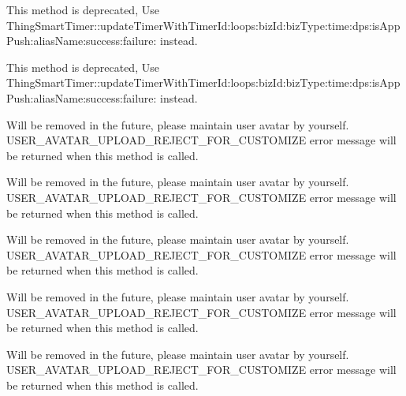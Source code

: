 \begin{DoxyRefList}
\label{deprecated__deprecated000128}%
%
This method is deprecated, Use Thing\+Smart\+Timer\+::update\+Timer\+With\+Timer\+Id\+:loops\+:biz\+Id\+:biz\+Type\+:time\+:dps\+:is\+App\+Push\+:alias\+Name\+:success\+:failure\+: instead. 

\label{deprecated__deprecated000110}%
%
This method is deprecated, Use Thing\+Smart\+Timer\+::update\+Timer\+With\+Timer\+Id\+:loops\+:biz\+Id\+:biz\+Type\+:time\+:dps\+:is\+App\+Push\+:alias\+Name\+:success\+:failure\+: instead.  
\item[Member \mbox{\hyperlink{interface_thing_smart_user_abab18c51135da5c939551c969058c966}{\mbox{[}Thing\+Smart\+User update\+Avatar\+With\+Image\+Url\+:success\+:failure\+:\mbox{]}}} ]\label{deprecated__deprecated000200}%
%
Will be removed in the future, please maintain user avatar by yourself. USER\+\_\+\+AVATAR\+\_\+\+UPLOAD\+\_\+\+REJECT\+\_\+\+FOR\+\_\+\+CUSTOMIZE error message will be returned when this method is called. 

\label{deprecated__deprecated000210}%
%
Will be removed in the future, please maintain user avatar by yourself. USER\+\_\+\+AVATAR\+\_\+\+UPLOAD\+\_\+\+REJECT\+\_\+\+FOR\+\_\+\+CUSTOMIZE error message will be returned when this method is called. 

\label{deprecated__deprecated000220}%
%
Will be removed in the future, please maintain user avatar by yourself. USER\+\_\+\+AVATAR\+\_\+\+UPLOAD\+\_\+\+REJECT\+\_\+\+FOR\+\_\+\+CUSTOMIZE error message will be returned when this method is called. 

\label{deprecated__deprecated000230}%
%
Will be removed in the future, please maintain user avatar by yourself. USER\+\_\+\+AVATAR\+\_\+\+UPLOAD\+\_\+\+REJECT\+\_\+\+FOR\+\_\+\+CUSTOMIZE error message will be returned when this method is called.  
\item[Member \mbox{\hyperlink{interface_thing_smart_user_aaff5b409bc4e4592549d760683296a3b}{\mbox{[}Thing\+Smart\+User update\+Head\+Icon\+:success\+:failure\+:\mbox{]}}} ]\label{deprecated__deprecated000199}%
%
Will be removed in the future, please maintain user avatar by yourself. USER\+\_\+\+AVATAR\+\_\+\+UPLOAD\+\_\+\+REJECT\+\_\+\+FOR\+\_\+\+CUSTOMIZE error message will be returned when this method is called. 


\end{DoxyRefList}
